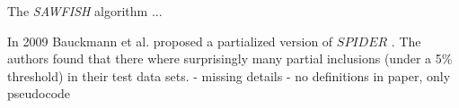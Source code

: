 The \textit{SAWFISH} algorithm \cite{kaminsky2023discovering} ...

In 2009 Bauckmann et al. proposed a partialized version of $SPIDER$ \cite{bauckmann2006efficiently}. The authors found that there where surprisingly many partial inclusions (under a 5\% threshold) in their test data sets.
- missing details
- no definitions in paper, only pseudocode